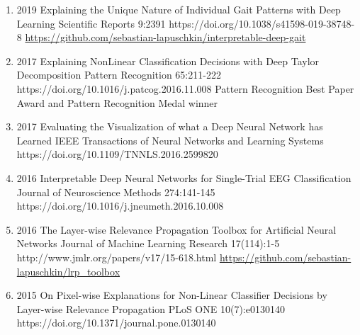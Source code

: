 \documentclass[10pt,a4paper]{article} %
\begin{document}
{\begin{enumerate}
    \item {}
                        {2019}
                        {Explaining the Unique Nature of Individual Gait Patterns with Deep Learning}
                        {Scientific Reports}
                        {9:2391}
                        {https://doi.org/10.1038/s41598-019-38748-8}
                        {\href{https://github.com/sebastian-lapuschkin/interpretable-deep-gait}{https://github.com/sebastian-lapuschkin/interpretable-deep-gait}}

    \item {}
                            {2017}
                            {Explaining NonLinear Classification Decisions with Deep Taylor Decomposition}
                            {Pattern Recognition}
                            {65:211-222}
                            {https://doi.org/10.1016/j.patcog.2016.11.008}
                            {Pattern Recognition Best Paper Award and Pattern Recognition Medal winner}

    \item {}
                        {2017}
                        {Evaluating the Visualization of what a Deep Neural Network has Learned}
                        {IEEE Transactions of Neural Networks and Learning Systems}
                        {}
                        {https://doi.org/10.1109/TNNLS.2016.2599820}

    \item {}
                        {2016}
                        {Interpretable Deep Neural Networks for Single-Trial EEG Classification}
                        {Journal of Neuroscience Methods}
                        {274:141-145}
                        {https://doi.org/10.1016/j.jneumeth.2016.10.008}

    \item {}
                        {2016}
                        {The Layer-wise Relevance Propagation Toolbox for Artificial Neural Networks}
                        {Journal of Machine Learning Research}
                        {17(114):1-5}
                        {http://www.jmlr.org/papers/v17/15-618.html}
                        {\href{https://github.com/sebastian-lapuschkin/lrp_toolbox}{https://github.com/sebastian-lapuschkin/lrp\_toolbox}}

    \item {}
                        {2015}
                        {On Pixel-wise Explanations for Non-Linear Classifier Decisions by Layer-wise Relevance Propagation}
                        {PLoS ONE}
                        {10(7):e0130140}
                        {https://doi.org/10.1371/journal.pone.0130140}
\end{enumerate}
}
\end{document}
